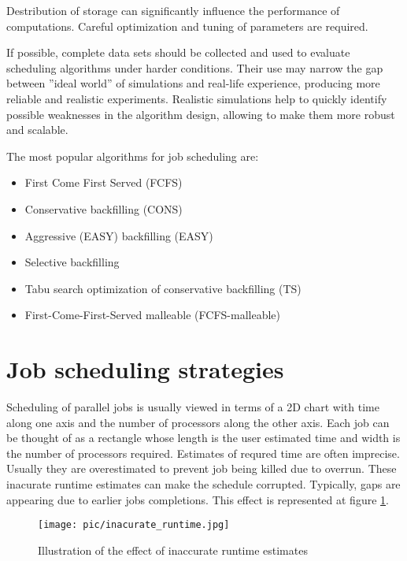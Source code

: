 \documentclass[a4paper,10pt]{article}
\begin{document}
Destribution of storage can significantly influence the performance of computations. Careful optimization and tuning of parameters are required.\cite{Horky ACAT}

If possible, complete data sets should be collected and used to evaluate scheduling algorithms under harder conditions. Their use may narrow the gap between ''ideal world'' of simulations and real-life experience, producing more reliable and realistic experiments. Realistic simulations help to  quickly identify possible weaknesses in the algorithm design, allowing to make them more robust and scalable. \cite{Rudova Experiments w J-sch}

The most popular algorithms for job scheduling are\cite{Rudova Experiments w J-sch}:
\begin{itemize}
\item First Come First Served (FCFS)
\item Conservative backfilling (CONS)
\item Aggressive (EASY) backfilling (EASY)
\item Selective backfilling
\item Tabu search optimization of conservative backfilling (TS)
\item First-Come-First-Served malleable (FCFS-malleable) 
\end{itemize}

\section{Job scheduling strategies}
Scheduling of parallel jobs is usually viewed in terms of a 2D chart with time along one axis and the number of processors along the other axis. Each job can be thought of as a rectangle whose length is the user estimated time and width is the number of processors required. \cite{Backfilling} Estimates of requred time are often imprecise. Usually they are overestimated to prevent job being killed due to overrun. These inacurate runtime estimates can make the schedule corrupted. Typically, gaps are appearing due to earlier jobs completions\cite{Rudova CP schedulling}. This effect is represented at figure \ref{wrong runtime estimates}.
\begin{figure}
\begin{center}
\texttt{[image: pic/inacurate\_runtime.jpg]}
\caption{Illustration of the effect of inaccurate runtime estimates\cite{Rudova CP schedulling}}
\label{wrong runtime estimates}
\end{center}
\end{figure}
\end{document}
